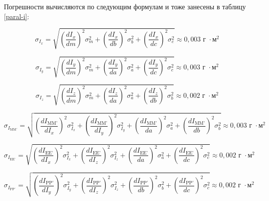 \documentclass[a4paper, 12pt]{article}
\begin{document}
Погрешности вычисляются по следующим формулам и тоже занесены в таблицу \ref{paral-i}:

\begin{equation}
    \sigma_{I_{x}} = \sqrt{
    \left( \frac{dI_{x}}{dm} \right)^2 \sigma_{m}^2 + 
    \left( \frac{dI_{x}}{db} \right)^2 \sigma_{b}^2 + 
    \left( \frac{dI_{x}}{dc} \right)^2 \sigma_{c}^2
    } \approx 0,003 \text{ г } \cdot \text{м}^2
\end{equation}

\begin{equation}
    \sigma_{I_{y}} = \sqrt{
    \left( \frac{dI_{y}}{dm} \right)^2 \sigma_{m}^2 + 
    \left( \frac{dI_{y}}{da} \right)^2 \sigma_{a}^2 + 
    \left( \frac{dI_{y}}{dc} \right)^2 \sigma_{c}^2
    } \approx 0,003 \text{ г } \cdot \text{м}^2
\end{equation}

\begin{equation}
    \sigma_{I_{z}} = \sqrt{
    \left( \frac{dI_{z}}{dm} \right)^2 \sigma_{m}^2 + 
    \left( \frac{dI_{z}}{da} \right)^2 \sigma_{a}^2 + 
    \left( \frac{dI_{z}}{db} \right)^2 \sigma_{b}^2
    } \approx 0,002 \text{ г } \cdot \text{м}^2
\end{equation}

\begin{equation}
    \sigma_{I_{\text{MM'}}} = \sqrt{
    \left( \frac{dI_{\text{MM'}}}{dI_{x}} \right)^2 \sigma_{I_{x}}^2 + 
    \left( \frac{dI_{\text{MM'}}}{dI_{y}} \right)^2 \sigma_{I_{y}}^2 + 
    \left( \frac{dI_{\text{MM'}}}{da} \right)^2 \sigma_{a}^2 + 
    \left( \frac{dI_{\text{MM'}}}{db} \right)^2 \sigma_{b}^2
    } \approx 0,003 \text{ г } \cdot \text{м}^2
\end{equation}

\begin{equation}
    \sigma_{I_{\text{EE'}}} = \sqrt{
    \left( \frac{dI_{\text{EE'}}}{dI_{x}} \right)^2 \sigma_{I_{x}}^2 + 
    \left( \frac{dI_{\text{EE'}}}{dI_{z}} \right)^2 \sigma_{I_{z}}^2 + 
    \left( \frac{dI_{\text{EE'}}}{da} \right)^2 \sigma_{a}^2 + 
    \left( \frac{dI_{\text{EE'}}}{dc} \right)^2 \sigma_{c}^2
    } \approx 0,002 \text{ г } \cdot \text{м}^2
\end{equation}

\begin{equation}
    \sigma_{I_{\text{PP'}}} = \sqrt{
    \left( \frac{dI_{\text{PP'}}}{dI_{y}} \right)^2 \sigma_{I_{y}}^2 + 
    \left( \frac{dI_{\text{PP'}}}{dI_{z}} \right)^2 \sigma_{I_{z}}^2 + 
    \left( \frac{dI_{\text{PP'}}}{db} \right)^2 \sigma_{b}^2 + 
    \left( \frac{dI_{\text{PP'}}}{dc} \right)^2 \sigma_{c}^2
    } \approx 0,002 \text{ г } \cdot \text{м}^2
\end{equation}
\end{document}
